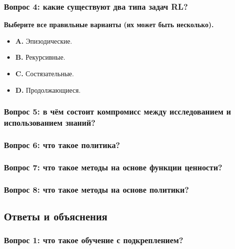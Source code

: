 \documentclass[11pt,a4paper]{article}
\begin{document}
\subsubsection{Вопрос 4: какие существуют два типа задач RL?}\label{q4-a-task-is-an-instance-of-a-reinforcement-learning-problem.-what-are-the-two-types-of-tasks}

\textbf{Выберите все правильные варианты (их может быть несколько).}

\begin{itemize}
\tightlist
\item
  \textbf{A.} Эпизодические.
\item
  \textbf{B.} Рекурсивные.
\item
  \textbf{C.} Состязательные.
\item
  \textbf{D.} Продолжающиеся.
\end{itemize}

\subsubsection{Вопрос 5: в чём состоит компромисс между исследованием и использованием знаний?}\label{q5-what-is-the-explorationexploitation-tradeoff}

\subsubsection{Вопрос 6: что такое политика?}\label{q6-what-is-a-policy}

\subsubsection{Вопрос 7: что такое методы на основе функции ценности?}\label{q7-what-are-value-based-methods}

\subsubsection{Вопрос 8: что такое методы на основе политики?}\label{q8-what-are-policy-based-methods}

\subsection{Ответы и объяснения}\label{answer-key-and-explanations}

\subsubsection{Вопрос 1: что такое обучение с подкреплением?}\label{q1-what-is-reinforcement-learning-1}
\end{document}
